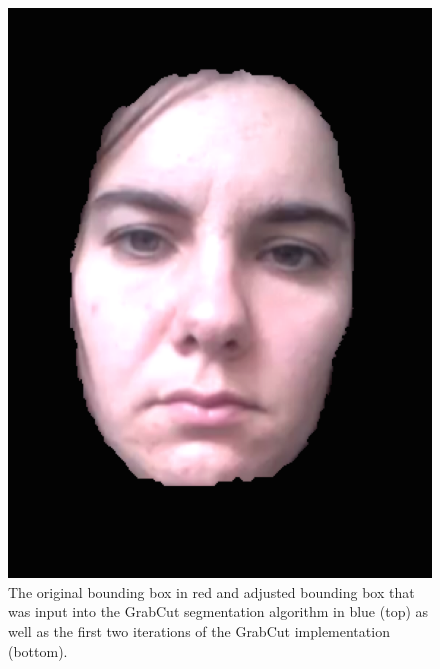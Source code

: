 \documentclass[10pt,twocolumn,letterpaper]{article}
\begin{document}
\begin{figure}
\begin{center}
	\includegraphics[scale=0.3]{figures/my_seg_it2}
\end{center}
\caption{The original bounding box in red and adjusted bounding box that was input into the GrabCut segmentation algorithm in blue (top) as well as the first two iterations of the GrabCut implementation (bottom).}
\label{segment}
\end{figure}
\end{document}
